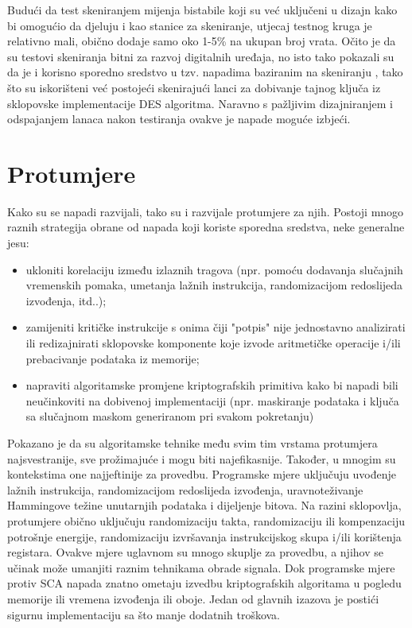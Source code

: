 \documentclass[times, utf8, diplomski]{fer}
\begin{document}
Budući da test skeniranjem mijenja bistabile koji su već uključeni u dizajn kako bi omogućio da djeluju i kao stanice za skeniranje, utjecaj testnog kruga je relativno mali, obično dodaje samo oko 1-5\% na ukupan broj vrata. \citep{semiconductorengineering_2019}
Očito je da su testovi skeniranja bitni za razvoj digitalnih uređaja, no isto tako \cite{yang2004scan} pokazali su da je i korisno sporedno sredstvo u tzv. napadima baziranim na skeniranju , tako što su iskorišteni već postojeći skenirajući lanci za dobivanje tajnog ključa iz sklopovske implementacije DES algoritma. Naravno s pažljivim dizajniranjem i odspajanjem lanaca nakon testiranja ovakve je napade moguće izbjeći.

\section{Protumjere}

Kako su se napadi razvijali, tako su i razvijale protumjere za njih. Postoji mnogo raznih strategija obrane od napada koji koriste sporedna sredstva, neke generalne jesu:
\begin{itemize}
    \item ukloniti korelaciju između izlaznih tragova (npr. pomoću dodavanja slučajnih vremenskih pomaka, umetanja lažnih instrukcija, randomizacijom redoslijeda izvođenja, itd..);
    \item zamijeniti kritičke instrukcije s onima čiji "potpis" nije jednostavno analizirati ili redizajnirati sklopovske komponente koje izvode aritmetičke operacije i/ili prebacivanje podataka iz memorije;
    \item napraviti algoritamske promjene kriptografskih primitiva kako bi napadi bili neučinkoviti na dobivenoj implementaciji (npr. maskiranje podataka i ključa sa slučajnom maskom generiranom pri svakom pokretanju)
\end{itemize}

Pokazano je da su algoritamske tehnike među svim tim vrstama protumjera najsvestranije, sve prožimajuće i mogu biti najefikasnije. Također, u mnogim su kontekstima one najjeftinije za provedbu. Programske mjere uključuju uvođenje lažnih instrukcija, randomizacijom redoslijeda izvođenja, uravnoteživanje Hammingove težine unutarnjih podataka i dijeljenje bitova. Na razini sklopovlja, protumjere obično uključuju randomizaciju takta, randomizaciju ili kompenzaciju potrošnje energije, randomizaciju izvršavanja instrukcijskog skupa i/ili korištenja registara. Ovakve mjere uglavnom su mnogo skuplje za provedbu, a njihov se učinak može umanjiti raznim tehnikama obrade signala. Dok programske mjere protiv SCA napada znatno ometaju izvedbu kriptografskih algoritama u pogledu memorije ili vremena izvođenja ili oboje. Jedan od glavnih izazova je postići sigurnu implementaciju sa što manje dodatnih troškova.
\end{document}
